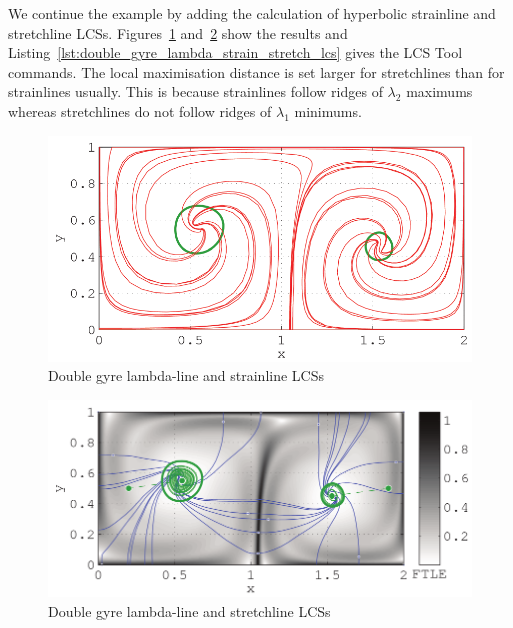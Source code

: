 \documentclass{article}
\begin{document}
We continue the example by adding the calculation of hyperbolic strainline and stretchline LCSs. Figures~\ref{fig:double_gyre_lambda_strain_lcs} and~\ref{fig:double_gyre_lambda_stretch_lcs} show the results and Listing~\ref{lst:double_gyre_lambda_strain_stretch_lcs} gives the LCS Tool commands. The local maximisation distance is set larger for stretchlines than for strainlines usually. This is because strainlines follow ridges of $\lambda_2$ maximums whereas stretchlines do not follow ridges of $\lambda_1$ minimums.

\begin{figure}
  \centering
  \includegraphics[width=\textwidth]{graphics/double_gyre/lambda_strain_lcs}
  \caption{Double gyre lambda-line and strainline LCSs}
  \label{fig:double_gyre_lambda_strain_lcs}
\end{figure}

\begin{figure}
  \centering
  \includegraphics[width=\textwidth]{graphics/double_gyre/lambda_stretch_lcs}
  \caption{Double gyre lambda-line and stretchline LCSs}
  \label{fig:double_gyre_lambda_stretch_lcs}
\end{figure}


\end{document}
